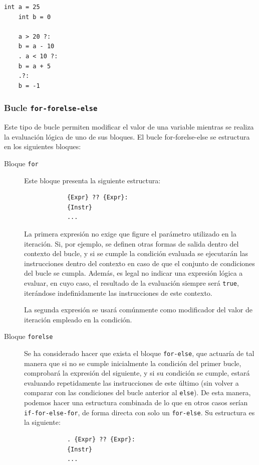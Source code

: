 \documentclass[11pt, english]{article}
\begin{document}
	\begin{lstlisting}[caption=Ejemplo de uso de la sentencia \texttt{if-ifelse-else}]
	int a = 25
	int b = 0
	
	a > 20 ?:
	b = a - 10
	. a < 10 ?:
	b = a + 5
	.?:
	b = -1
	\end{lstlisting}
	
	\subsubsection{Bucle \texttt{for-forelse-else}}
	Este tipo de bucle permiten modificar el valor de una variable mientras se realiza la evaluación lógica de uno de sus bloques. El bucle for-forelse-else se estructura en los siguientes bloques:
	
	\begin{description}
		\item[Bloque \texttt{for}] Este bloque presenta la siguiente estructura:
		\begin{center}
			\begin{lstlisting}
			{Expr} ?? {Expr}:
			{Instr}
			...
			\end{lstlisting}
		\end{center}
		
		La primera expresión no exige que figure el parámetro utilizado en la iteración. Si, por ejemplo, se definen otras formas de salida dentro del contexto del bucle, y si se cumple la condición evaluada se ejecutarán las instrucciones dentro del contexto en caso de que el conjunto de condiciones del bucle se cumpla. Además, es legal no indicar una expresión lógica a evaluar, en cuyo caso, el resultado de la evaluación siempre será \texttt{true}, iterándose indefinidamente las instrucciones de este contexto. 
		
		La segunda expresión se usará comúnmente como modificador del valor de iteración empleado en la condición.
		
		\item[Bloque \texttt{forelse}] Se ha considerado hacer que exista el bloque \texttt{for-else}, que actuaría de tal manera que si no se cumple inicialmente la condición del primer bucle, comprobará la expresión del siguiente, y si su condición se cumple, estará evaluando repetidamente las instrucciones de este último (sin volver a comparar con las condiciones del bucle anterior al \texttt{else}). De esta manera, podemos hacer una estructura combinada de lo que en otros casos serían \texttt{if-for-else-for}, de forma directa con solo un \texttt{for-else}. \vspace{10px}Su estructura es la siguiente:
		\begin{center}
			\begin{lstlisting}
			. {Expr} ?? {Expr}:
			{Instr}
			...
			\end{lstlisting}
		\end{center}
		

\end{description}
\end{document}
